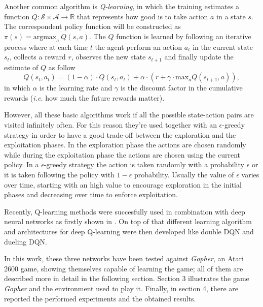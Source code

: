 \documentclass[article,11pt]{article}
\begin{document}
	Another common algorithm is \textit{Q-learning}, in which the training estimates a function $Q: \mathcal{S}\times\mathcal{A}\to\mathbb{R}$ that represents how good is to take action $a$ in a state $s$. The correspondent policy function will be constructed as $\pi(s) = \text{argmax}_{a}\ Q(s, a)$. The $Q$ function is learned by following an iterative process where at each time $t$ the agent perform an action $a_t$ in the current state $s_t$, collects a reward $r$, observes the new state $s_{t+1}$ and finally update the estimate of $Q$ as follow
	\begin{equation}
		\label{eq:qlearning}
		Q(s_t, a_t) = (1-\alpha)\cdot Q(s_t, a_t) + \alpha \cdot (r + \gamma\cdot \text{max}_aQ(s_{t+1}, a)),
	\end{equation}
	in which $\alpha$ is the learning rate and $\gamma$ is the discount factor in the cumulative rewards (\textit{i.e.} how much the future rewards matter).
	
	However, all these basic algorithms work if all the possible state-action pairs are visited infinitely often. For this reason they're used together with an $\epsilon$-greedy strategy in order to have a good trade-off between the exploration and the exploitation phases. In the exploration phase the actions are chosen randomly while during the exploitation phase the actions are chosen using the current policy. In a $\epsilon$-greedy strategy the action is taken randomly with a probability $\epsilon$ or it is taken following the policy with $1-\epsilon$ probability. Usually the value of $\epsilon$ varies over time, starting with an high value to encourage exploration in the initial phases and decreasing over time to enforce exploitation.
	
	Recently, Q-learning methods were succesfully used in combination with deep neural networks as firstly shown in \cite{dqn2013}. On top of that different learning algorithm and architectures for deep Q-learning were then developed like double DQN\cite{doubledqn} and dueling DQN\cite{duelingdqn}.
	
	In this work, these three networks have been tested against \textit{Gopher}, an Atari 2600 game, showing themselves capable of learning the game; all of them are described more in detail in the following section. 
	Section 3 illustrates the game \textit{Gopher} and the environment used to play it. Finally, in section 4, there are reported the  performed experiments and the obtained results.
	
\end{document}

